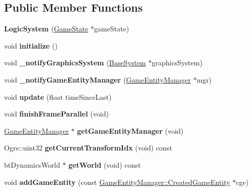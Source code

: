 \subsection*{Public Member Functions}
\begin{DoxyCompactItemize}
\item 
\mbox{\label{class_common_1_1_logic_system_a414d0489e458dea69dd8386fd556acc2}} 
{\bfseries Logic\+System} (\hyperlink{class_common_1_1_game_state}{Game\+State} $\ast$game\+State)
\item 
\mbox{\label{class_common_1_1_logic_system_a6e1389a1e2ed8dd21b46fabdedee5d22}} 
void {\bfseries initialize} ()
\item 
\mbox{\label{class_common_1_1_logic_system_a0897460fb4f985b0bd85c2d130b9d585}} 
void {\bfseries \+\_\+notify\+Graphics\+System} (\hyperlink{class_common_1_1_base_system}{Base\+System} $\ast$graphics\+System)
\item 
\mbox{\label{class_common_1_1_logic_system_a5eb233fa1e610dbf2b52a76d06ce9782}} 
void {\bfseries \+\_\+notify\+Game\+Entity\+Manager} (\hyperlink{class_common_1_1_game_entity_manager}{Game\+Entity\+Manager} $\ast$mgr)
\item 
\mbox{\label{class_common_1_1_logic_system_a8f11d71f1f95adbb95dcb6c4281d699a}} 
void {\bfseries update} (float time\+Since\+Last)
\item 
\mbox{\label{class_common_1_1_logic_system_a4aeed6252b67c4213bd2ba0ca2a6e39c}} 
void {\bfseries finish\+Frame\+Parallel} (void)
\item 
\mbox{\label{class_common_1_1_logic_system_a957d149fb5f02d2d00ec4a4a1827fc2e}} 
\hyperlink{class_common_1_1_game_entity_manager}{Game\+Entity\+Manager} $\ast$ {\bfseries get\+Game\+Entity\+Manager} (void)
\item 
\mbox{\label{class_common_1_1_logic_system_a175efaf2f8faf4949e9141cb90a477ce}} 
Ogre\+::uint32 {\bfseries get\+Current\+Transform\+Idx} (void) const
\item 
\mbox{\label{class_common_1_1_logic_system_a1172de6e34685a951f956235ca10ca52}} 
bt\+Dynamics\+World $\ast$ {\bfseries get\+World} (void) const
\item 
\mbox{\label{class_common_1_1_logic_system_a8ff1976c824aab7d67481390b5e81a4d}} 
void {\bfseries add\+Game\+Entity} (const \hyperlink{struct_common_1_1_game_entity_manager_1_1_created_game_entity}{Game\+Entity\+Manager\+::\+Created\+Game\+Entity} $\ast$cge)
\end{DoxyCompactItemize}

